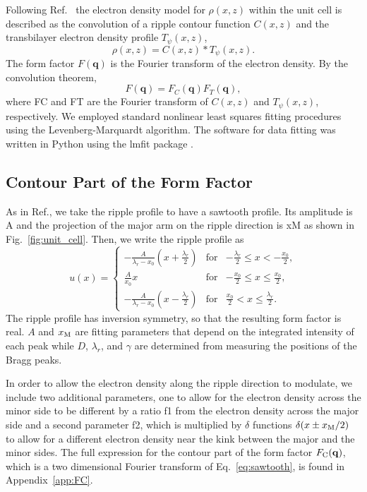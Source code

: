 Following Ref.~\cite{ref:Sun96} the electron density model for $\rho(x,z)$ within 
the unit cell is described
as the convolution of a ripple contour function $C(x,z)$ and the transbilayer
electron density profile $T_\psi(x,z)$,
\begin{equation}
  \rho(x,z) = C(x,z) * T_\psi(x,z).
\end{equation}
The form factor $F(\mathbf{q})$ is the Fourier transform of the electron density.
By the convolution theorem, 
\begin{equation}
  F(\mathbf{q}) = F_C(\mathbf{q})F_T(\mathbf{q}),
\end{equation}
where \gls{FC} and \gls{FT} are the Fourier transform 
of $C(x,z)$ and $T_\psi(x,z)$, respectively.
We employed standard nonlinear least squares fitting procedures using
the Levenberg-Marquardt algorithm.
The software for data fitting was written in Python using 
the lmfit package \cite{ref:lmfit}.

\subsection{Contour Part of the Form Factor}\label{sec:contour}
As in Ref.\cite{ref:Sun96}, we take the ripple profile to have a sawtooth profile. Its
amplitude is \gls{A} and the projection of the major arm on the 
ripple direction is \gls{xM} as shown in Fig.~\ref{fig:unit_cell}. 
Then, we write the ripple profile as
\begin{equation}
  u(x) = \left\{
    \begin{array}{ccc}
    -\frac{A}{\lambda_r-x_0}\left(x+\frac{\lambda_r}{2}\right) 
      & \text{for} 
      & -\frac{\lambda_r}{2} \leq x < -\frac{x_0}{2}, \\
    \frac{A}{x_0}x 
      & \text{for} 
      & -\frac{x_0}{2} \leq x \leq \frac{x_0}{2}, \\
    -\frac{A}{\lambda_r-x_0} \left(x-\frac{\lambda_r}{2}\right)
      & \text{for} 
      & \frac{x_0}{2} < x \leq \frac{\lambda_r}{2}.
    \end{array} \right.
  \label{eq:sawtooth}
\end{equation}
The ripple profile has inversion symmetry, so that the resulting
form factor is real. $A$ and $x_\textrm{M}$ are fitting parameters that depend 
on the integrated intensity of each peak while $D$, $\lambda_r$, and $\gamma$
are determined from measuring the positions of the Bragg peaks.

In order to allow the electron density along the ripple direction to 
modulate, we include two additional parameters, one to allow for the electron
density across the minor side to be different by a ratio \gls{f1} from the 
electron density across the major side and a second parameter \gls{f2}, which
is multiplied by $\delta$ functions $\delta(x \pm x_\textrm{M}/2)$ to allow for 
a different electron density near the kink between the major and the minor
sides. The full expression for the contour part of the form factor $F_\mathrm{C}(\mathbf{q})$,
which is a two dimensional Fourier transform of Eq.~\ref{eq:sawtooth},
is found in Appendix~\ref{app:FC}.

